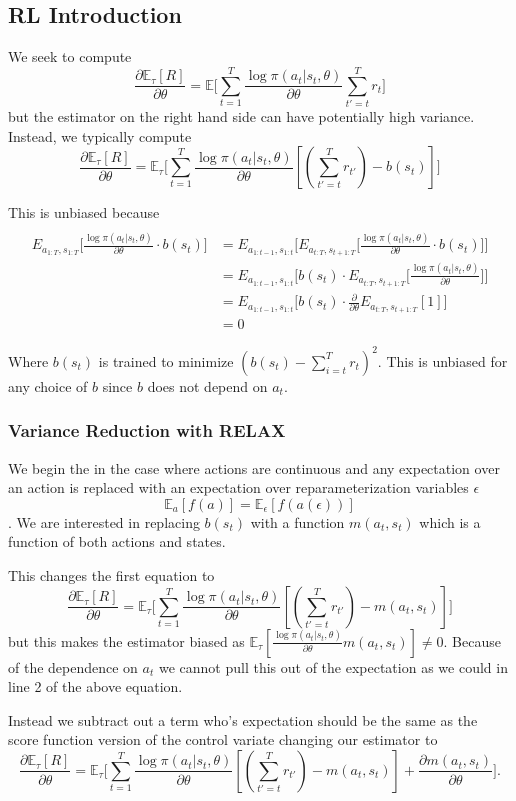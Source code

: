 \documentclass{article}
\newcommand{\E}{\mathbb{E}}
\newcommand{\LL}[1]{\frac{\log \pi(a_{#1}| s_{#1}, \theta)}{\partial \theta}}
\begin{document}
\subsection{RL Introduction}
We seek to compute $$\frac{\partial \E_\tau[R]}{\partial \theta} = \E\Big[\sum_{t=1}^T \LL{t} \sum_{t'=t}^T r_t\Big]$$ but the estimator on the right hand side can have potentially high variance. Instead, we typically compute $$\frac{\partial \E_\tau[R]}{\partial \theta} = \E_\tau\Big[\sum_{t=1}^T \LL{t} [(\sum_{t'=t}^T r_{t'}) - b(s_t)]\Big]$$

This is unbiased because
\begin{align}
\\E_{a_{1:T},s_{1:T}}\Big[\LL{t}\cdot b(s_t)\Big] &= E_{a_{1:t-1},s_{1:t}}\Big[ E_{a_{t:T},s_{t+1:T}} \Big[\LL{t}\cdot b(s_t)\Big]\Big]\\
&= E_{a_{1:t-1},s_{1:t}}\Big[b(s_t)\cdot E_{a_{t:T},s_{t+1:T}} \Big[\LL{t}\Big]\Big]\\
&= E_{a_{1:t-1},s_{1:t}}\Big[b(s_t)\cdot \frac{\partial}{\partial \theta} E_{a_{t:T},s_{t+1:T}} [1]\Big]\\
&= 0
\end{align}

Where $b(s_t)$ is trained to minimize $(b(s_t) - \sum_{i=t}^T r_t)^2.$ This is unbiased for any choice of $b$ since $b$ does not depend on $a_t$. 

\subsubsection{Variance Reduction with RELAX}
We begin the in the case where actions are continuous and any expectation over an action is replaced with an expectation over reparameterization variables $\epsilon$ $$\E_a[f(a)] = \E_\epsilon[f(a(\epsilon))]$$.  We are interested in replacing $b(s_t)$ with a function $m(a_t, s_t)$ which is a function of both actions and states.

This changes the first equation to $$\frac{\partial \E_\tau[R]}{\partial \theta} = \E_\tau\Big[\sum_{t=1}^T \LL{t} [(\sum_{t'=t}^T r_{t'}) - m(a_t, s_t)]\Big]$$ but this makes the estimator biased as $\E_\tau [\LL{t}m(a_t, s_t)] \neq 0$. Because of the dependence on $a_t$ we cannot pull this out of the expectation as we could in line 2 of the above equation.

Instead we subtract out a term who's expectation should be the same as the score function version of the control variate changing our estimator to  $$\frac{\partial \E_\tau[R]}{\partial \theta} = \E_\tau\Big[\sum_{t=1}^T \LL{t} [(\sum_{t'=t}^T r_{t'}) - m(a_t, s_t)] + \frac{\partial m(a_t, s_t)}{\partial\theta}\Big].$$ 
\end{document}
